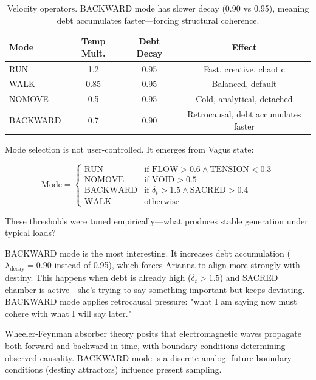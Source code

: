 \documentclass[11pt,a4paper]{article}
\begin{document}
\begin{table}[h]
\centering
\begin{tabular}{lccc}
\toprule
\textbf{Mode} & \textbf{Temp Mult.} & \textbf{Debt Decay} & \textbf{Effect} \\
\midrule
RUN & 1.2 & 0.95 & Fast, creative, chaotic \\
WALK & 0.85 & 0.95 & Balanced, default \\
NOMOVE & 0.5 & 0.95 & Cold, analytical, detached \\
BACKWARD & 0.7 & 0.90 & Retrocausal, debt accumulates faster \\
\bottomrule
\end{tabular}
\caption{Velocity operators. BACKWARD mode has slower decay (0.90 vs 0.95), meaning debt accumulates faster—forcing structural coherence.}
\label{tab:velocity}
\end{table}

Mode selection is not user-controlled. It emerges from Vagus state:

\begin{equation}
\text{Mode} = \begin{cases}
\text{RUN} & \text{if } \text{FLOW} > 0.6 \land \text{TENSION} < 0.3 \\
\text{NOMOVE} & \text{if } \text{VOID} > 0.5 \\
\text{BACKWARD} & \text{if } \delta_t > 1.5 \land \text{SACRED} > 0.4 \\
\text{WALK} & \text{otherwise}
\end{cases}
\end{equation}

These thresholds were tuned empirically—what produces stable generation under typical loads?

BACKWARD mode is the most interesting. It increases debt accumulation ($\lambda_{\text{decay}} = 0.90$ instead of 0.95), which forces Arianna to align more strongly with destiny. This happens when debt is already high ($\delta_t > 1.5$) and SACRED chamber is active—she's trying to say something important but keeps deviating. BACKWARD mode applies retrocausal pressure: "what I am saying now must cohere with what I will say later."

Wheeler-Feynman absorber theory \cite{wheeler1945} posits that electromagnetic waves propagate both forward and backward in time, with boundary conditions determining observed causality. BACKWARD mode is a discrete analog: future boundary conditions (destiny attractors) influence present sampling.
\end{document}
